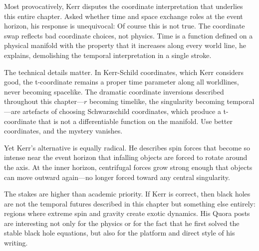 \begin{commentary}
Most provocatively, Kerr disputes the coordinate interpretation that underlies this entire chapter. Asked whether \QSOpen{}time and space exchange roles at the event horizon,\QSClose{} his response is unequivocal: \QSOpen{}Of course this is not true.\QSClose{} The coordinate swap reflects bad coordinate choices, not physics. \QSOpen{}Time is a function defined on a physical manifold with the property that it increases along every world line,\QSClose{} he explains, demolishing the temporal interpretation in a single stroke.

The technical details matter. In Kerr-Schild coordinates, which Kerr considers \QSOpen{}good,\QSClose{} the t-coordinate remains a proper time parameter along all worldlines, never becoming spacelike. The dramatic coordinate inversions described throughout this chapter—$r$ becoming timelike, the singularity becoming temporal—are artefacts of choosing Schwarzschild coordinates, which produce a t-coordinate that \QSOpen{}is not a differentiable function on the manifold.\QSClose{} Use better coordinates, and the mystery vanishes.

Yet Kerr's alternative is equally radical. He describes \QSOpen{}spin forces\QSClose{} that become so intense near the event horizon that infalling objects are forced to rotate around the axis. At the inner horizon, centrifugal forces grow strong enough that objects can move outward again—no longer forced toward any central singularity.

The stakes are higher than academic priority. If Kerr is correct, then black holes are not the temporal futures described in this chapter but something else entirely: regions where extreme spin and gravity create exotic dynamics. His Quora posts are interesting not only for the physics or for the fact that he first solved the stable black hole equations, but also for the platform and direct style of his writing.
\end{commentary}

\newpage

\vspace*{\fill}

